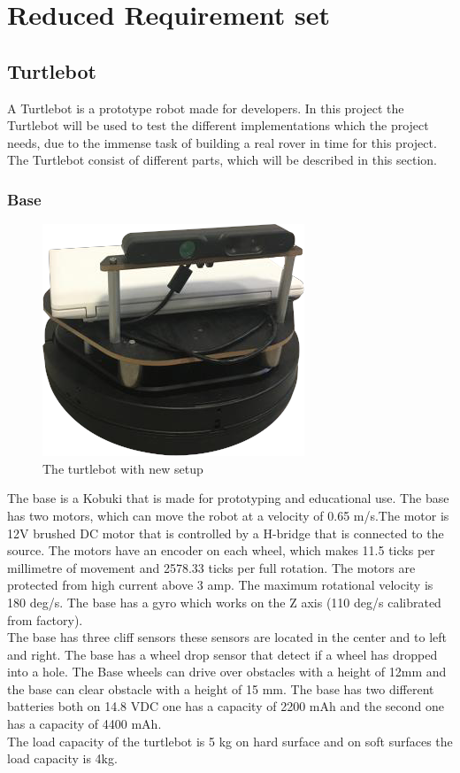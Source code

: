 \chapter{Reduced Requirement set} \label{ch:Reduced Requirement Set}

\section{Turtlebot} %
A Turtlebot is a prototype robot made for developers. In this project the Turtlebot will be used to test the different implementations which the project needs, due to the immense task of building a real rover in time for this project.\\
The Turtlebot consist of different parts, which will be described in this section.

\subsection{Base} %
\begin{figure}[h]
    \centering
    \includegraphics[width=.5\textwidth]{figures/turtlebot001.png}
    \caption{The turtlebot with new setup} 
    \label{fig:turtlebot} 
\end{figure}
The base is a Kobuki that is made for prototyping and educational use. The base has two motors, which can move the robot at a velocity of 0.65 m/s.The motor is 12V brushed DC motor that is controlled by a H-bridge that is connected to the source. The motors have an encoder on each wheel, which makes 11.5 ticks per millimetre of movement and 2578.33 ticks per full rotation. The motors are protected from high current above 3 amp. The maximum rotational velocity is 180 deg/s. The base has a gyro which works on the Z axis (110 deg/s calibrated from factory).\\
The base has three cliff sensors these sensors are located in the center and to left and right. The base has a wheel drop sensor that detect if a wheel has dropped into a hole. The Base wheels can drive over obstacles with a height of 12mm and the base can clear obstacle with a height of 15 mm. The base has two different batteries both on 14.8 VDC one has a capacity of 2200 mAh and the second one has a capacity of 4400 mAh.\\ 
The load capacity of the turtlebot is 5 kg on hard surface and on soft surfaces the load capacity is 4kg\cite{Base}.



